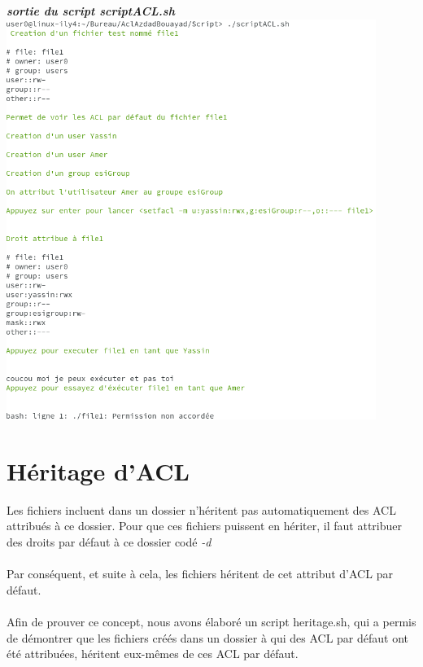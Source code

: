 \documentclass{article}
\begin{document}
\begin{center}
    \textbf{\textit{sortie du script scriptACL.sh}}
\includegraphics[width=12cm]{images/scriptACL.png}
\end{center}
\newpage
\section{Héritage d'ACL}
Les fichiers incluent dans un dossier n'héritent pas automatiquement des ACL attribués à ce dossier. Pour que ces fichiers puissent en hériter, il faut attribuer des droits par défaut à ce dossier codé \textit{-d}\\\\
Par conséquent, et suite à cela, les fichiers héritent de cet attribut d'ACL par défaut.\\\\
Afin de prouver ce concept, nous avons élaboré un script heritage.sh, qui a permis de démontrer que les fichiers créés dans un dossier à qui des ACL par défaut ont été attribuées, héritent eux-mêmes de ces ACL par défaut.
\end{document}
